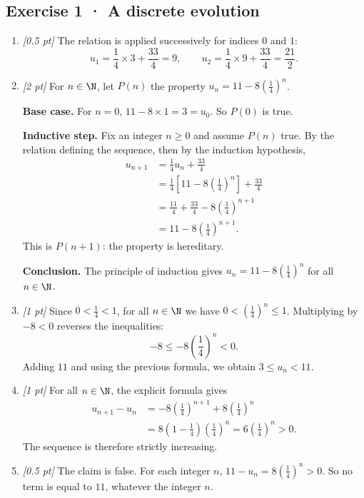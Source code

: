 \subsection*{Exercise 1 · A discrete evolution}\begin{enumerate}

\item \textit{[0.5 pt]} The relation is applied successively for indices $0$ and $1$:\[u_1=\frac{1}{4}\times 3+\frac{33}{4}=9,\qquad u_2=\frac{1}{4}\times 9+\frac{33}{4}=\frac{21}{2}.\]

\item \textit{[2 pt]} For $n\in\N$, let $P(n)$ the property $u_n=11-8\left(\frac{1}{4}\right)^n$.
\par\smallskip\textbf{Base case.} For $n=0$, $11-8\times1=3=u_0$. So $P(0)$ is true.
\par\smallskip\textbf{Inductive step.} Fix an integer $n\ge0$ and assume $P(n)$ true. By the relation defining the sequence, then by the induction hypothesis,
\[\begin{aligned}u_{n+1}&=\frac{1}{4}u_n+\frac{33}{4}\\
&=\frac{1}{4}\left[11-8\left(\frac{1}{4}\right)^n\right]+\frac{33}{4}\\
&=\frac{11}{4}+\frac{33}{4}-8\left(\frac{1}{4}\right)^{n+1}\\
&=11-8\left(\frac{1}{4}\right)^{n+1}.
\end{aligned}\]
This is $P(n+1)$: the property is hereditary.
\par\smallskip\textbf{Conclusion.} The principle of induction gives $u_n=11-8\left(\frac{1}{4}\right)^n$ for all $n\in\N$.

\item \textit{[1 pt]} Since $0<\frac{1}{4}<1$, for all $n\in\N$ we have $0<(\frac{1}{4})^n\le1$. Multiplying by $-8<0$ reverses the inequalities:
\[-8\le-8(\frac{1}{4})^n<0.\]
Adding $11$ and using the previous formula, we obtain $3\le u_n<11$.

\item \textit{[1 pt]} For all $n\in\N$, the explicit formula gives
\[\begin{aligned}u_{n+1}-u_n&=-8(\frac{1}{4})^{n+1}+8(\frac{1}{4})^n\\&=8(1-\frac{1}{4})(\frac{1}{4})^n=6(\frac{1}{4})^n>0.\end{aligned}\]
The sequence is therefore strictly increasing.

\item \textit{[0.5 pt]} The claim is false. For each integer $n$, $11-u_n=8(\frac{1}{4})^n>0$. So no term is equal to $11$, whatever the integer $n$.

\end{enumerate}

